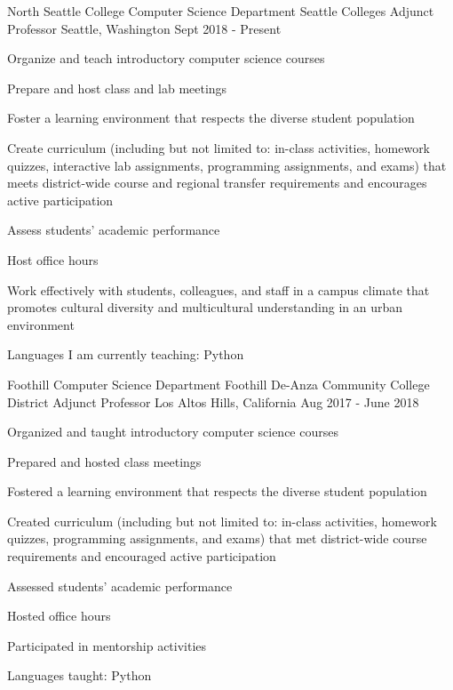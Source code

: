 \begin{cventries}

  \cventry
{North Seattle College Computer Science Department \newline Seattle Colleges}
    {Adjunct Professor}
    {Seattle, Washington}
    {Sept 2018 - Present}
    {
      \begin{cvitems}
	\item {Organize and teach introductory computer science courses}\\
	\begin{cvitems}
         \item Prepare and host class and lab meetings
                  \item Foster a learning environment that respects the diverse student population
                  \item Create curriculum (including but not limited to: in-class activities, homework quizzes, interactive lab assignments, programming assignments, and exams) that meets district-wide course and regional transfer requirements and encourages active participation
		\item Assess students' academic performance
		\item Host office hours
	\end{cvitems}
	\vspace{2mm}
	\item Work effectively with students, colleagues, and staff in a campus climate that promotes cultural diversity and multicultural understanding in an urban environment
	\item Languages I am currently teaching: Python
      \end{cvitems}
    }

  \cventry
{Foothill Computer Science Department \newline Foothill De-Anza Community College District}
    {Adjunct Professor}
    {Los Altos Hills, California}
    {Aug 2017 - June 2018}
    {
      \begin{cvitems}
	\item {Organized and taught introductory computer science courses}\\
	\begin{cvitems}
         \item Prepared and hosted class meetings
                  \item Fostered a learning environment that respects the diverse student population
		\item Created curriculum (including but not limited to: in-class activities, homework quizzes, programming assignments, and exams) that met district-wide course requirements and encouraged active participation
		\item Assessed students' academic performance
		\item Hosted office hours
	\end{cvitems}
	\vspace{2mm}
	\item Participated in mentorship activities
	\item Languages taught: Python
      \end{cvitems}
    }


\end{cventries}
